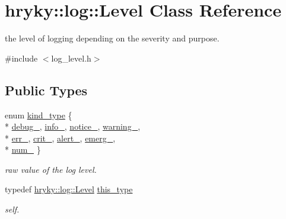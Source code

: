 \hypertarget{classhryky_1_1log_1_1_level}{\section{hryky\-:\-:log\-:\-:Level Class Reference}
\label{classhryky_1_1log_1_1_level}
}


the level of logging depending on the severity and purpose.  




{\ttfamily \#include $<$log\-\_\-level.\-h$>$}

\subsection*{Public Types}
\begin{DoxyCompactItemize}
\item 
enum \hyperlink{classhryky_1_1log_1_1_level_a9e6bba8f272859b212f49e4478a863d7}{kind\-\_\-type} \{ \\*
\hyperlink{classhryky_1_1log_1_1_level_a9e6bba8f272859b212f49e4478a863d7a9e66c9bec86b804ca7b483d470b3d1fc}{debug\-\_\-}, 
\hyperlink{classhryky_1_1log_1_1_level_a9e6bba8f272859b212f49e4478a863d7af1fa5c4581c2c7715e12d2717adc5705}{info\-\_\-}, 
\hyperlink{classhryky_1_1log_1_1_level_a9e6bba8f272859b212f49e4478a863d7a89fea8b8aac2d57814d50d86678baead}{notice\-\_\-}, 
\hyperlink{classhryky_1_1log_1_1_level_a9e6bba8f272859b212f49e4478a863d7a495a85e2f2bc926a2b27e55522b165fa}{warning\-\_\-}, 
\\*
\hyperlink{classhryky_1_1log_1_1_level_a9e6bba8f272859b212f49e4478a863d7a40b4bfcc7ad7c7cc81b208d017d73cf3}{err\-\_\-}, 
\hyperlink{classhryky_1_1log_1_1_level_a9e6bba8f272859b212f49e4478a863d7a1aee1f138c8b27174506f680faaaa177}{crit\-\_\-}, 
\hyperlink{classhryky_1_1log_1_1_level_a9e6bba8f272859b212f49e4478a863d7a2bb8a07f237e71df835ee42379218ea7}{alert\-\_\-}, 
\hyperlink{classhryky_1_1log_1_1_level_a9e6bba8f272859b212f49e4478a863d7a89780835043440040b9a3e7c03d44008}{emerg\-\_\-}, 
\\*
\hyperlink{classhryky_1_1log_1_1_level_a9e6bba8f272859b212f49e4478a863d7ad7a9a505788d17fe8ff399bb536bfc08}{num\-\_\-}
 \}
\begin{DoxyCompactList}\small\item\em raw value of the log level. \end{DoxyCompactList}\item 
\hypertarget{classhryky_1_1log_1_1_level_a2a7ccc2d552dfdf72dc1d543e18c4780}{typedef \hyperlink{classhryky_1_1log_1_1_level}{hryky\-::log\-::\-Level} \hyperlink{classhryky_1_1log_1_1_level_a2a7ccc2d552dfdf72dc1d543e18c4780}{this\-\_\-type}}\label{classhryky_1_1log_1_1_level_a2a7ccc2d552dfdf72dc1d543e18c4780}

\begin{DoxyCompactList}\small\item\em self. \end{DoxyCompactList}\end{DoxyCompactItemize}

